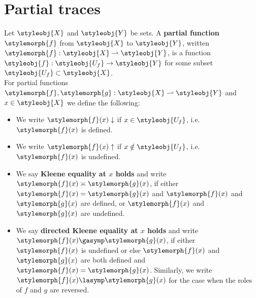 
\section{Partial traces}

\begin{definition}
    Let $\styleobj{X}$ and $\styleobj{Y}$ be sets.
    A \textbf{partial function} $\stylemorph{f}$ from $\styleobj{X}$ to $\styleobj{Y}$, written $\stylemorph{f}:\styleobj{X}\rightharpoonup\styleobj{Y}$, is a function $\styleobj{f}:\styleobj{U_{f}}\to\styleobj{Y}$ for some subset $\styleobj{U_{f}}\subset\styleobj{X}$.
    \\
    For partial functions $\stylemorph{f},\stylemorph{g}:\styleobj{X}\rightharpoonup\styleobj{Y}$ and $x\in\styleobj{X}$ we define the following:
    \begin{itemize}
        \item We write $\stylemorph{f}(x)\downarrow$ if $x\in\styleobj{U_{f}}$, i.e. $\stylemorph{f}(x)$ is defined.
        \item We write $\stylemorph{f}(x)\uparrow$ if $x\notin\styleobj{U_{f}}$, i.e. $\stylemorph{f}(x)$ is undefined.
        \item We say \textbf{Kleene equality at $x$ holds} and write $\stylemorph{f}(x)\asymp \stylemorph{g}(x)$, if either $\stylemorph{f}(x)=\stylemorph{g}(x)$ and $\stylemorph{f}(x)$ and $\stylemorph{g}(x)$ are defined, or $\stylemorph{f}(x)$ and $\stylemorph{g}(x)$ are undefined.
        \item We say \textbf{ directed Kleene equality at $x$ holds} and write $\stylemorph{f}(x)\gasymp \stylemorph{g}(x)$, if either $\stylemorph{f}(x)$ is undefined or else $\stylemorph{f}(x)$ and $\stylemorph{g}(x)$ are both defined and $\stylemorph{f}(x)=\stylemorph{g}(x)$.
              Similarly, we write $\stylemorph{f}(x)\lasymp\stylemorph{g}(x)$ for the case when the roles of $f$ and $g$ are reversed.
    \end{itemize}
\end{definition}

